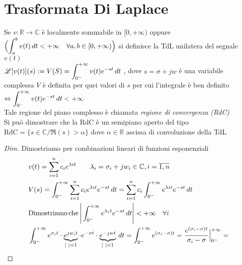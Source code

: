 \chapter{Trasformata Di Laplace}

\theoremstyle{definition}
\theoremstyle{remark}

%

\begin{definizione}
   Se $v:\mathbb{R}\to\mathbb{C}$ è localmente sommabile in $[0, +\infty)$ oppure \\$\Bigl(\displaystyle\int_a^bv(t)\,dt < +\infty\quad\forall a,b \in[0, +\infty)\Bigr)$ si definisce la TdL unilatera del segnale $v(t)$\\
   $\displaystyle\mathscr{L}[v(t)](s) := V(S) = \int_{0^-}^{+\infty} v(t)e^{-st}\,dt$ , dove $s = \sigma + jw$ è una variabile complessa
   $V$ è definita per quei valori di $s$ per cui l'integrale è ben definito\\ $\displaystyle\Leftrightarrow \int_{0^-}^{+\infty} v(t)e^{-st}\,dt < +\infty$\\
   Tale regione del piano complesso è chiamata \emph{regione di convergenza (RdC)}\\
   Si può dimostrare che la RdC è un semipiano aperto del tipo \\$\mathrm{RdC} = \{s\in\mathbb{C}/\Re(s)>\alpha\}$ dove $\alpha\in\mathbb{R}$ ascissa di convoluzione della TdL
   \begin{proof}[Dim]
      Dimostriamo per combinazioni lineari di funzioni esponenziali
      \[
         \begin{split}
            & v(t) = \sum_{i = 1}^nc_ie^{\lambda it} \qquad \lambda_i = \sigma_i + jw_i\in\mathbb{C}, i = \overline{1,n}\\
            & V(s) = \intZeroInfinity \sum_{i = 1}^nc_ie^{\lambda it}e^{-st}\,dt = \sum_{i = 1}^nc_i\intZeroInfinity e^{\lambda it}e^{-st}\,dt\\
            & \mathrm{Dimostriamo\, che\, } \Bigg\lvert\intZeroInfinity e^{\lambda_it}e^{-st}\,dt\Bigg\rvert < +\infty\quad\forall i \\
            & \intZeroInfinity e^{\sigma_it}\cdot \underbrace{e^{jw_it}}_{\lvert\,\,\rvert = 1}\cdot e^{-\sigma t}\cdot \underbrace{e^{-jwt}}_{\lvert\,\,\rvert = 1}\,dt = \intZeroInfinity e^{(\sigma_i - \sigma)t} = \frac{e^{(\sigma_i - \sigma)t}}{\sigma_i - \sigma}\Big|_{0^-}^{+\infty} =\\

\end{split}\]
\end{proof}
\end{definizione}
